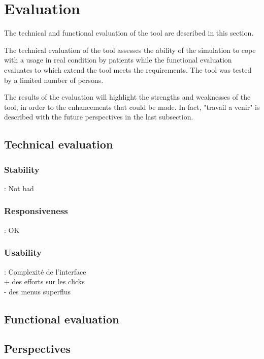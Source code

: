 \section{Evaluation}

The technical and functional evaluation of the tool are described in this section. 

The technical evaluation of the tool assesses the ability of the simulation to cope with a usage in real condition by patients
while the functional evaluation evaluates to which extend the tool meets the requirements.
The tool was tested by a limited number of persons. %

The results of the evaluation will highlight the strengths and weaknesses of the tool, in order to %
the enhancements that could be made. In fact, "travail a venir" is described with the future perspectives in the last subsection.


\subsection{Technical evaluation}
\subsubsection{Stability} 
: Not bad
\subsubsection{Responsiveness} 
: %
OK
\subsubsection{Usability} 
: Complexité de l'interface\\

+ des efforts sur les clicks\\
- des menus superflus

\subsection{Functional evaluation}


\subsection{Perspectives}

